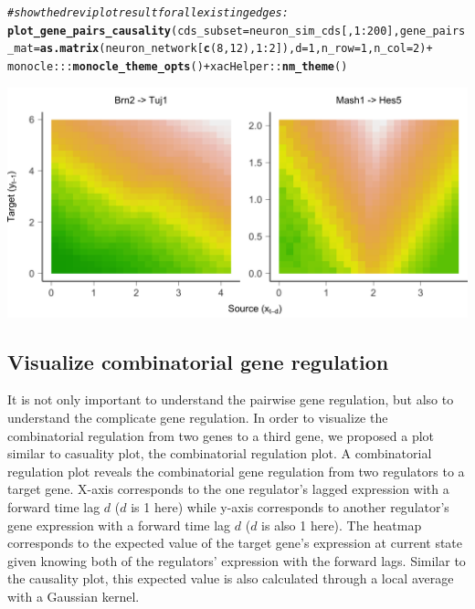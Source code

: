 \documentclass[10pt,oneside]{article}\usepackage[]{graphicx}\usepackage[]{color}
\makeatletter
\def\maxwidth{ %
  \ifdim\Gin@nat@width>\linewidth
    \linewidth
  \else
    \Gin@nat@width
  \fi
}
\newcommand{\hlnum}[1]{\textcolor[rgb]{0.686,0.059,0.569}{#1}}%
\newcommand{\hlcom}[1]{\textcolor[rgb]{0.678,0.584,0.686}{\textit{#1}}}%
\newcommand{\hlopt}[1]{\textcolor[rgb]{0,0,0}{#1}}%
\newcommand{\hlstd}[1]{\textcolor[rgb]{0.345,0.345,0.345}{#1}}%
\newcommand{\hlkwc}[1]{\textcolor[rgb]{0.333,0.667,0.333}{#1}}%
\newcommand{\hlkwd}[1]{\textcolor[rgb]{0.737,0.353,0.396}{\textbf{#1}}}%
\newenvironment{kframe}{%
 \def\at@end@of@kframe{}%
 \ifinner\ifhmode%
  \def\at@end@of@kframe{\end{minipage}}%
  \begin{minipage}{\columnwidth}%
 \fi\fi%
 \def\FrameCommand##1{\hskip\@totalleftmargin \hskip-\fboxsep
 \colorbox{shadecolor}{##1}\hskip-\fboxsep
     \hskip-\linewidth \hskip-\@totalleftmargin \hskip\columnwidth}%
 \MakeFramed {\advance\hsize-\width
   \@totalleftmargin\z@ \linewidth\hsize
   \@setminipage}}%
 {\par\unskip\endMakeFramed%
 \at@end@of@kframe}
\newenvironment{knitrout}{}{} %
\makeatother
\begin{document}
\begin{knitrout}
\color{fgcolor}\begin{kframe}
\begin{alltt}
\hlcom{# show the drevi plot result for all existing edges:}
\hlkwd{plot_gene_pairs_causality}\hlstd{(}\hlkwc{cds_subset} \hlstd{= neuron_sim_cds[,} \hlnum{1}\hlopt{:}\hlnum{200}\hlstd{],} \hlkwc{gene_pairs_mat} \hlstd{=} \hlkwd{as.matrix}\hlstd{(neuron_network[}\hlkwd{c}\hlstd{(}\hlnum{8}\hlstd{,} \hlnum{12}\hlstd{),} \hlnum{1}\hlopt{:}\hlnum{2}\hlstd{]),} \hlkwc{d} \hlstd{=} \hlnum{1}\hlstd{,} \hlkwc{n_row} \hlstd{=} \hlnum{1}\hlstd{,} \hlkwc{n_col} \hlstd{=} \hlnum{2}\hlstd{)} \hlopt{+}
  \hlstd{monocle}\hlopt{:::}\hlkwd{monocle_theme_opts}\hlstd{()} \hlopt{+} \hlstd{xacHelper}\hlopt{::}\hlkwd{nm_theme}\hlstd{()}
\end{alltt}
\end{kframe}

{\centering \includegraphics[width=\maxwidth]{figure/plot_gene_pairs_causality-1} 

}



\end{knitrout}

\subsection{Visualize combinatorial gene regulation}
It is not only important to understand the pairwise gene regulation, but also to understand the complicate gene regulation. In order to visualize the combinatorial regulation from two genes to a third gene, we proposed a plot similar to casuality plot, the combinatorial regulation plot. A combinatorial regulation plot reveals the combinatorial gene regulation from two regulators to a target gene. X-axis corresponds to the one regulator's lagged expression with a forward time lag $d$ ($d$ is 1 here) while y-axis corresponds to another regulator's gene expression with a forward time lag $d$ ($d$  is also 1 here).  The heatmap corresponds to the expected value of the target gene's expression at current state given knowing both of the regulators' expression with the forward lags. Similar to the causality plot, this expected value is also calculated through a local average with a Gaussian kernel. 
\end{document}
